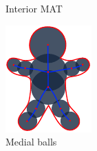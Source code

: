 \begin{figure}[tbp]
\begin{subfigure}[b]{0.25\linewidth}
		\caption{Interior MAT}
		\label{fig:gbm:maxis}
	\end{subfigure}

	\begin{subfigure}[b]{0.3\linewidth}
		\centering
		\includegraphics[width=\textwidth]{figs/gingerbreadman_mat.pdf}
		\caption{Medial balls}
		\label{fig:gbm:mballs}
	\end{subfigure}
	\qquad
	\begin{subfigure}[b]{0.3\linewidth}
		\centering

\end{subfigure}
\end{figure}
